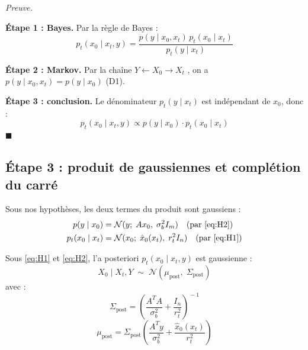 \documentclass[12pt]{article}
\renewcommand{\qedsymbol}{$\blacksquare$}
\renewenvironment{proof}[1][\proofname]{%
  \par\medskip\noindent
  \textit{\color{proofgray}#1.}\enspace\ignorespaces
}{\hfill\qedsymbol\par\medskip}
\renewcommand{\proofname}{Preuve}
\begin{document}
 \begin{proof}






\textbf{Étape 1 : Bayes.} Par la règle de Bayes :
\[
p_t(x_0 \mid x_t, y) = \frac{p(y \mid x_0, x_t)\, p_t(x_0 \mid x_t)}{p_t(y \mid x_t)}
\]

\textbf{Étape 2 : Markov.} Par la chaîne $Y \leftarrow X_0 \to X_t$ , on a $p(y \mid x_0, x_t) = p(y \mid x_0)$ (D1).

\textbf{Étape 3 : conclusion.} Le dénominateur $p_t(y \mid x_t)$ est indépendant de $x_0$, donc :
\[
p_t(x_0 \mid x_t, y) \propto p(y \mid x_0) \cdot p_t(x_0 \mid x_t)
\]
\end{proof}


\subsection{Étape 3 : produit de gaussiennes et complétion du carré}

Sous nos hypothèses, les deux termes du produit sont gaussiens :
\begin{align}
    p(y \mid x_0) &= \mathcal{N}(y;\; Ax_0,\; \sigma_b^2 I_m) \quad \text{(par \ref{eq:H2})} \\
    p_t(x_0 \mid x_t) &= \mathcal{N}(x_0;\; \hat{x}_0(x_t),\; r_t^2 I_n) \quad \text{(par \ref{eq:H1})}
\end{align}

\begin{resultbox}
\label{thm:posterior_closed}
Sous \ref{eq:H1} et \ref{eq:H2}, l'a posteriori $p_t(x_0 \mid x_t, y)$ est gaussienne :
\begin{equation}
    X_0 \mid X_t, Y \;\sim\; \mathcal{N}(\mu_{\text{post}},\; \Sigma_{\text{post}})
\end{equation}
avec :
\begin{equation}
    \boxed{\Sigma_{\text{post}} = \left(\frac{A^T A}{\sigma_b^2} + \frac{I_n}{r_t^2}\right)^{\!-1}}
    \label{eq:sigma_post}
\end{equation}
\begin{equation}
    \boxed{\mu_{\text{post}} = \Sigma_{\text{post}} \left(\frac{A^T y}{\sigma_b^2} + \frac{\hat{x}_0(x_t)}{r_t^2}\right)}
    \label{eq:mu_post}
\end{equation}
\end{resultbox}
\end{document}
